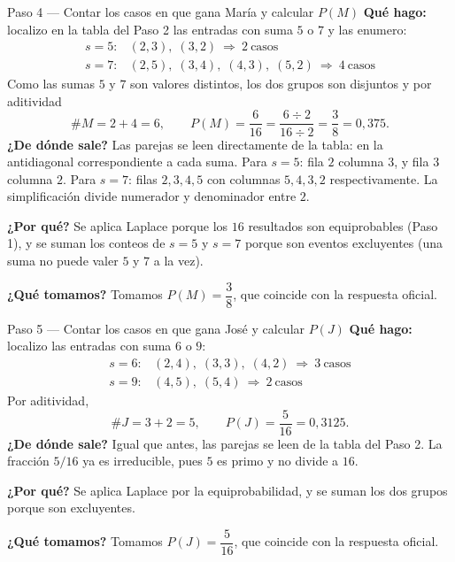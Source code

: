 \documentclass[11pt]{article}
\begin{document}
\begin{sol}
\begin{paso}{Paso 4 --- Contar los casos en que gana María y calcular $P(M)$}
\textbf{Qué hago:} localizo en la tabla del Paso 2 las entradas con suma $5$ o $7$ y las
enumero:
\[
\begin{array}{ll}
s=5: & (2,3),\;(3,2)\ \Rightarrow\ 2\ \text{casos}\\
s=7: & (2,5),\;(3,4),\;(4,3),\;(5,2)\ \Rightarrow\ 4\ \text{casos}
\end{array}
\]
Como las sumas $5$ y $7$ son valores distintos, los dos grupos son disjuntos y por aditividad
\[
\#M=2+4=6,
\qquad
P(M)=\frac{6}{16}=\frac{6\div 2}{16\div 2}=\frac{3}{8}=0{,}375 .
\]
\textbf{¿De dónde sale?} Las parejas se leen directamente de la tabla: en la antidiagonal
correspondiente a cada suma. Para $s=5$: fila $2$ columna $3$, y fila $3$ columna $2$. Para
$s=7$: filas $2,3,4,5$ con columnas $5,4,3,2$ respectivamente. La simplificación divide
numerador y denominador entre $2$.

\textbf{¿Por qué?} Se aplica Laplace porque los $16$ resultados son equiprobables (Paso 1), y
se suman los conteos de $s=5$ y $s=7$ porque son eventos excluyentes (una suma no puede valer
$5$ y $7$ a la vez).

\textbf{¿Qué tomamos?} Tomamos $P(M)=\dfrac{3}{8}$, que coincide con la respuesta oficial.
\end{paso}

\begin{paso}{Paso 5 --- Contar los casos en que gana José y calcular $P(J)$}
\textbf{Qué hago:} localizo las entradas con suma $6$ o $9$:
\[
\begin{array}{ll}
s=6: & (2,4),\;(3,3),\;(4,2)\ \Rightarrow\ 3\ \text{casos}\\
s=9: & (4,5),\;(5,4)\ \Rightarrow\ 2\ \text{casos}
\end{array}
\]
Por aditividad,
\[
\#J=3+2=5,
\qquad
P(J)=\frac{5}{16}=0{,}3125 .
\]
\textbf{¿De dónde sale?} Igual que antes, las parejas se leen de la tabla del Paso 2. La
fracción $5/16$ ya es irreducible, pues $5$ es primo y no divide a $16$.

\textbf{¿Por qué?} Se aplica Laplace por la equiprobabilidad, y se suman los dos grupos porque
son excluyentes.

\textbf{¿Qué tomamos?} Tomamos $P(J)=\dfrac{5}{16}$, que coincide con la respuesta oficial.
\end{paso}


\end{sol}
\end{document}
